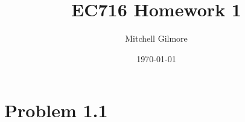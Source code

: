 \documentclass{article}
\title{EC716 Homework 1}
\author{Mitchell Gilmore}
\date{\today}
\begin{document}
	\maketitle

	\section*{Problem 1.1}
	\begin{figure}[h]
		
	\end{figure}
\end{document}
